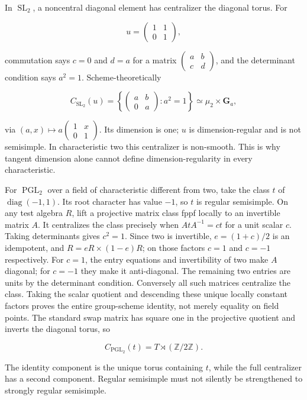 \documentclass[11pt,a4paper,openany]{report}
\begin{document}
In \(\operatorname{SL}_2\), a noncentral diagonal element has centralizer the diagonal torus. For

\[
u=\begin{pmatrix}1&1\\0&1\end{pmatrix},
\]

commutation says \(c=0\) and \(d=a\) for a matrix \(\begin{pmatrix}a&b\\c&d\end{pmatrix}\), and the determinant condition says \(a^2=1\). Scheme-theoretically

\[
C_{\operatorname{SL}_2}(u)=
\left\{\begin{pmatrix}a&b\\0&a\end{pmatrix}:a^2=1\right\}
\simeq\mu_2\times\mathbf G_a,
\]

via \((a,x)\mapsto a\begin{pmatrix}1&x\\0&1\end{pmatrix}\). Its dimension is one; \(u\) is dimension-regular and is not semisimple. In characteristic two this centralizer is non-smooth. This is why tangent dimension alone cannot define dimension-regularity in every characteristic.

For \(\operatorname{PGL}_2\) over a field of characteristic different from two, take the class \(t\) of \(\operatorname{diag}(-1,1)\). Its root character has value \(-1\), so \(t\) is regular semisimple. On any test algebra \(R\), lift a projective matrix class fppf locally to an invertible matrix \(A\). It centralizes the class precisely when \(AtA^{-1}=ct\) for a unit scalar \(c\). Taking determinants gives \(c^2=1\). Since two is invertible, \(e=(1+c)/2\) is an idempotent, and \(R=eR\times(1-e)R\); on those factors \(c=1\) and \(c=-1\) respectively. For \(c=1\), the entry equations and invertibility of two make \(A\) diagonal; for \(c=-1\) they make it anti-diagonal. The remaining two entries are units by the determinant condition. Conversely all such matrices centralize the class. Taking the scalar quotient and descending these unique locally constant factors proves the entire group-scheme identity, not merely equality on field points. The standard swap matrix has square one in the projective quotient and inverts the diagonal torus, so

\[
C_{\operatorname{PGL}_2}(t)=T\rtimes(\mathbb Z/2\mathbb Z).
\]

The identity component is the unique torus containing \(t\), while the full centralizer has a second component. Regular semisimple must not silently be strengthened to strongly regular semisimple.
\end{document}
